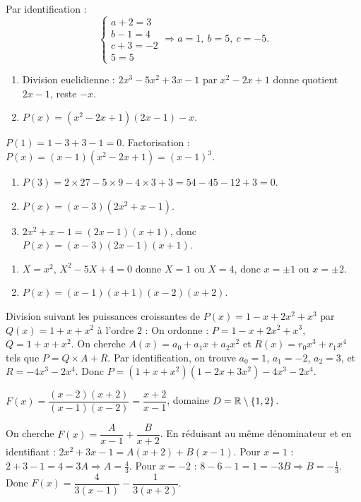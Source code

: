 Par identification :
\[
\begin{cases}
a+2 = 3 \\
b-1 = 4 \\
c+3 = -2 \\
5 = 5
\end{cases}
\Rightarrow a = 1,\ b = 5,\ c = -5.
\]

\begin{enumerate}[label=\alph*)]
    \item Division euclidienne : $2x^3 - 5x^2 + 3x - 1$ par $x^2 - 2x + 1$ donne quotient $2x - 1$, reste $ -x$.
    \item $P(x) = (x^2 - 2x + 1)(2x - 1) - x$.
\end{enumerate}

$P(1) = 1 - 3 + 3 - 1 = 0$. Factorisation : $P(x) = (x-1)(x^2 - 2x + 1) = (x-1)^3$.

\begin{enumerate}[label=\alph*)]
    \item $P(3) = 2 \times 27 - 5 \times 9 - 4 \times 3 + 3 = 54 - 45 - 12 + 3 = 0$.
    \item $P(x) = (x-3)(2x^2 + x - 1)$.
    \item $2x^2 + x - 1 = (2x-1)(x+1)$, donc $P(x) = (x-3)(2x-1)(x+1)$.
\end{enumerate}

\begin{enumerate}[label=\alph*)]
    \item $X = x^2$, $X^2 - 5X + 4 = 0$ donne $X = 1$ ou $X = 4$, donc $x = \pm 1$ ou $x = \pm 2$.
    \item $P(x) = (x-1)(x+1)(x-2)(x+2)$.
\end{enumerate}

Division suivant les puissances croissantes de $P(x) = 1 - x + 2x^2 + x^3$ par $Q(x) = 1 + x + x^2$ à l'ordre $2$ :
On ordonne : $P = 1 - x + 2x^2 + x^3$, $Q = 1 + x + x^2$.
On cherche $A(x) = a_0 + a_1 x + a_2 x^2$ et $R(x) = r_0 x^3 + r_1 x^4$ tels que $P = Q \times A + R$.
Par identification, on trouve $a_0 = 1$, $a_1 = -2$, $a_2 = 3$, et $R = -4x^3 - 2x^4$.
Donc $P = (1 + x + x^2)(1 - 2x + 3x^2) - 4x^3 - 2x^4$.

$F(x) = \dfrac{(x-2)(x+2)}{(x-1)(x-2)} = \dfrac{x+2}{x-1}$, domaine $D = \mathbb{R} \setminus \{1, 2\}$.

On cherche $F(x) = \dfrac{A}{x-1} + \dfrac{B}{x+2}$. En réduisant au même dénominateur et en identifiant :
$2x^2 + 3x - 1 = A(x+2) + B(x-1)$. Pour $x=1$ : $2+3-1 = 4 = 3A \Rightarrow A = \frac{4}{3}$.
Pour $x=-2$ : $8 - 6 - 1 = 1 = -3B \Rightarrow B = -\frac{1}{3}$.
Donc $F(x) = \dfrac{4}{3(x-1)} - \dfrac{1}{3(x+2)}$.

